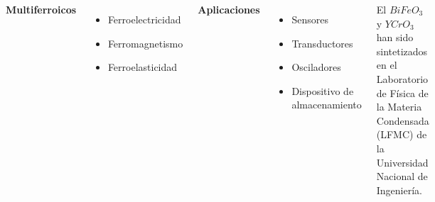 \begin{frame}{}
    \begin{columns}[t]
\textbf{Multiferroicos}
\begin{itemize}
    \item {\small Ferroelectricidad}
    \item {\small Ferromagnetismo}
    \item {\small Ferroelasticidad}
    \end{itemize}
\textbf{Aplicaciones}
\begin{itemize}
    \item {\small Sensores}
    \item {\small Transductores}
    \item {\small Osciladores}
    \item {\small Dispositivo de almacenamiento}
\end{itemize}
{\small El $BiFeO_{3}$ y $YCrO_{3}$ han sido sintetizados en el Laboratorio de F\'isica de la Materia Condensada (LFMC) de la Universidad Nacional de Ingenier\'ia.}
    \end{columns}
\end{frame}